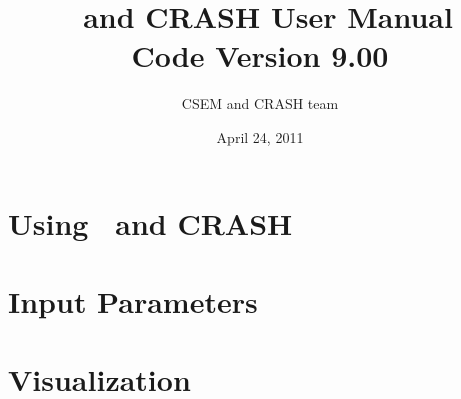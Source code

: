 \documentclass[twoside,10pt]{book}
\title{\BATSRUS\ and CRASH User Manual \\ \large Code Version 9.00}
\author{CSEM and CRASH team}
\date{April 24, 2011}
\begin{document}
\pagestyle{fancy}
\lhead[\fancyplain{}{\bfseries\thepage}]{\fancyplain{}{\bfseries\rightmark}}
\rhead[\fancyplain{}{\bfseries\leftmark}]{\fancyplain{}{\bfseries\thepage}}
\cfoot{}

\maketitle

\tableofcontents



\chapter{Using \BATSRUS\ and CRASH \label{chapter:usage}}





\chapter{Input Parameters \label{chapter:param}}






\chapter{Visualization \label{chapter:visualization}}





%
\end{document}
